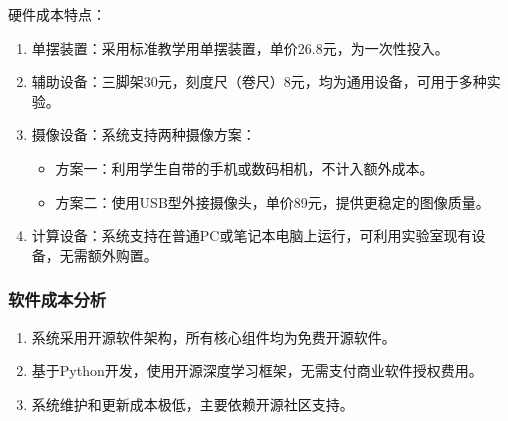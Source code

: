 硬件成本特点：
\begin{enumerate}[leftmargin=*]
    \item 单摆装置：采用标准教学用单摆装置，单价26.8元，为一次性投入。
    
    \item 辅助设备：三脚架30元，刻度尺（卷尺）8元，均为通用设备，可用于多种实验。
    
    \item 摄像设备：系统支持两种摄像方案：
    \begin{itemize}
        \item 方案一：利用学生自带的手机或数码相机，不计入额外成本。
        \item 方案二：使用USB型外接摄像头，单价89元，提供更稳定的图像质量。
    \end{itemize}
    
    \item 计算设备：系统支持在普通PC或笔记本电脑上运行，可利用实验室现有设备，无需额外购置。
\end{enumerate}

\subsubsection{软件成本分析}
\begin{enumerate}[leftmargin=*]
    \item 系统采用开源软件架构，所有核心组件均为免费开源软件。
    
    \item 基于Python开发，使用开源深度学习框架，无需支付商业软件授权费用。
    
    \item 系统维护和更新成本极低，主要依赖开源社区支持。
\end{enumerate}


